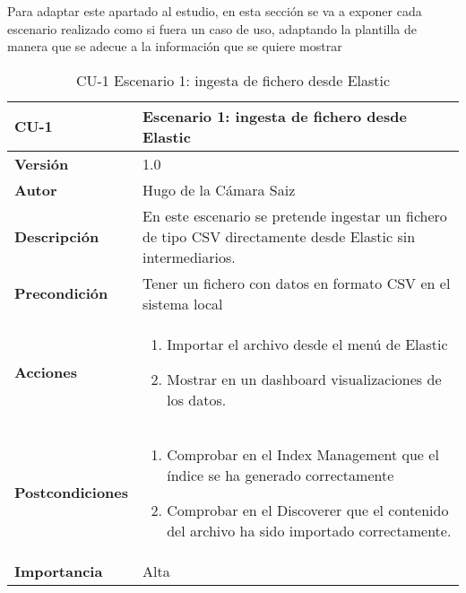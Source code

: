 Para adaptar este apartado al estudio, en esta sección se va a exponer cada escenario realizado como si fuera un caso de uso, adaptando la plantilla de manera que se adecue a la información que se quiere mostrar
\begin{table}[p]
	\centering
	\begin{tabularx}{\linewidth}{ p{} p{} }
		\toprule
		\textbf{CU-1}    & \textbf{Escenario 1: ingesta de fichero desde Elastic}\\
		\toprule
		\textbf{Versión}              & 1.0    \\
		\textbf{Autor}                & Hugo de la Cámara Saiz \\
		\textbf{Descripción}          & En este escenario se pretende ingestar un fichero de tipo CSV directamente desde Elastic sin intermediarios. \\
		\textbf{Precondición}         & Tener un fichero con datos en formato CSV en el sistema local  \\
		\textbf{Acciones}             &
		\begin{enumerate}
			\def\labelenumi{\arabic{enumi}.}
			\tightlist
			\item Importar el archivo desde el menú de Elastic
                \item Mostrar en un dashboard visualizaciones de los datos.
		\end{enumerate}\\
            \textbf{Postcondiciones}             &
		\begin{enumerate}
			\def\labelenumi{\arabic{enumi}.}
			\tightlist
			\item Comprobar en el Index Management que el índice se ha generado correctamente
			\item Comprobar en el Discoverer que el contenido del archivo ha sido importado correctamente.
		\end{enumerate}\\
		\textbf{Importancia}          & Alta \\
		\bottomrule
	\end{tabularx}
	\caption{CU-1 Escenario 1: ingesta de fichero desde Elastic}
\end{table}

